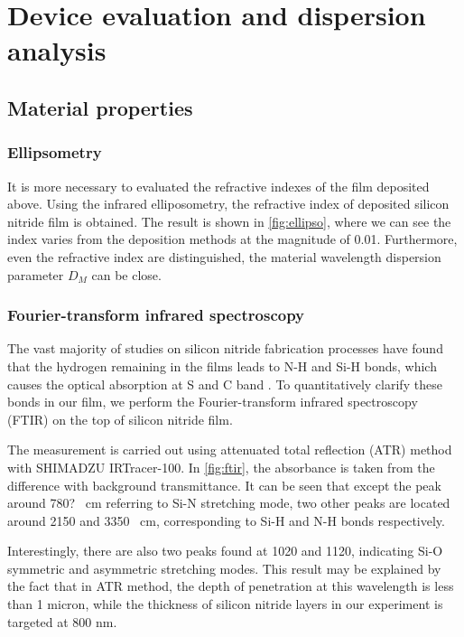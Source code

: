 
\chapter{Device evaluation and dispersion analysis}%


\section{Material properties}

\subsection{Ellipsometry}

It is more necessary to evaluated the refractive indexes of the film deposited above. Using the infrared elliposometry, the refractive index of deposited silicon nitride film is obtained. The result is shown in \autoref{fig:ellipso}, where we can see the index varies from the deposition methods at the magnitude of 0.01.
Furthermore, even the refractive index are distinguished, the material wavelength dispersion parameter $D_M$ can be close.

\subsection{Fourier-transform infrared spectroscopy}

The vast majority of studies on silicon nitride fabrication processes have found that the hydrogen remaining in the films leads to N-H and Si-H bonds, which causes the optical absorption at S and C band \cites{Ay2004, Agnihotri2000}. To quantitatively clarify these bonds in our film, we perform the Fourier-transform infrared spectroscopy (FTIR) on the top of silicon nitride film.

The measurement is carried out using attenuated total reflection (ATR) method with SHIMADZU IRTracer-100. In \autoref{fig:ftir}, the absorbance is taken from the difference with background transmittance. It can be seen that except the peak around 780? \si{\per\cm} referring to Si-N stretching mode, two other peaks are located around 2150 and 3350 \si{\per\cm}, corresponding to Si-H and N-H bonds respectively.

Interestingly, there are also two peaks found at 1020 and 1120, indicating Si-O symmetric and asymmetric stretching modes. This result may be explained by the fact that in ATR method, the depth of penetration at this wavelength is less than 1 micron, while the thickness of silicon nitride layers in our experiment is targeted at 800 nm.


